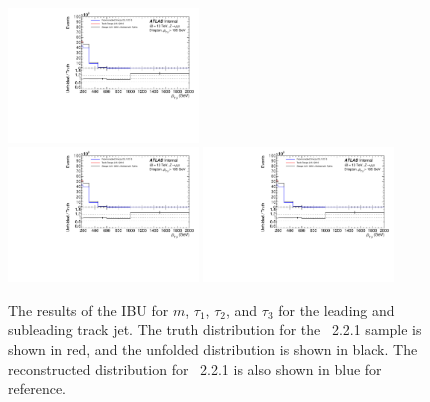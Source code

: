 \begin{figure}
  \includegraphics[page=97,width=0.45\textwidth]{figures/IBUPlots.pdf} \\
  \includegraphics[page=91,width=0.45\textwidth]{figures/IBUPlots.pdf}
  \includegraphics[page=98,width=0.45\textwidth]{figures/IBUPlots.pdf}
  \caption{The results of the IBU for $m$, $\tau_1$, $\tau_2$, and $\tau_3$ for the leading and subleading track jet. The truth distribution for the \sherpa~2.2.1 sample is shown in red, and the unfolded distribution is shown in black. The reconstructed distribution for \sherpa~2.2.1 is also shown in blue for reference.}
  \label{fig:UnfoldIBU2}
\end{figure}
